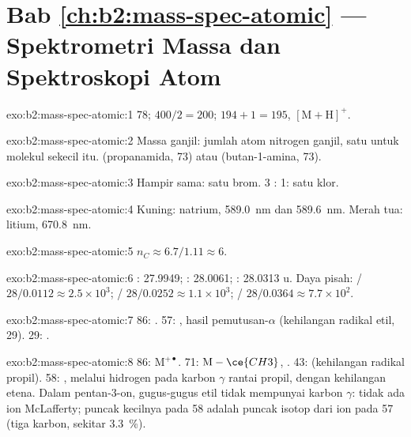 \section*{Bab \ref{ch:b2:mass-spec-atomic} --- Spektrometri Massa dan Spektroskopi Atom}

\begin{solution}{exo:b2:mass-spec-atomic:1}
78; $400/2 = 200$; $194 + 1 = 195$, $[\mathrm M + \mathrm H]^+$.
\end{solution}

\begin{solution}{exo:b2:mass-spec-atomic:2}
Massa ganjil: jumlah atom nitrogen ganjil, satu untuk molekul sekecil itu.
 (propanamida, 73) atau  (butan-1-amina, 73).
\end{solution}

\begin{solution}{exo:b2:mass-spec-atomic:3}
Hampir sama: satu brom. 3 : 1: satu klor.
\end{solution}

\begin{solution}{exo:b2:mass-spec-atomic:4}
Kuning: natrium, \qty{589.0}{nm} dan \qty{589.6}{nm}. Merah tua: litium, \qty{670.8}{nm}.
\end{solution}

\begin{solution}{exo:b2:mass-spec-atomic:5}
$n_C \approx 6.7/1.11 \approx 6$.
\end{solution}

\begin{solution}{exo:b2:mass-spec-atomic:6}
: 27.9949; : 28.0061; : 28.0313 u. Daya pisah: / $28/0.0112
\approx 2.5 \times 10^3$; / $28/0.0252 \approx 1.1 \times 10^3$; /
$28/0.0364 \approx 7.7 \times 10^2$.
\end{solution}

\begin{solution}{exo:b2:mass-spec-atomic:7}
86:  . 57: ,  hasil
pemutusan-$\alpha$ (kehilangan radikal etil, 29). 29: .
\end{solution}

\begin{solution}{exo:b2:mass-spec-atomic:8}
86: $\mathrm M^{+\bullet}$. 71: $\mathrm M - \ce{CH3}$, 
. 43: 
(kehilangan radikal propil). 58: , melalui
hidrogen pada karbon
$\gamma$ rantai propil, dengan kehilangan etena. Dalam pentan-3-on,
gugus-gugus etil tidak mempunyai karbon $\gamma$: tidak ada ion McLafferty;
puncak kecilnya pada 58 adalah puncak isotop  dari ion pada 57
(tiga karbon, sekitar 3.3~\%).
\end{solution}

